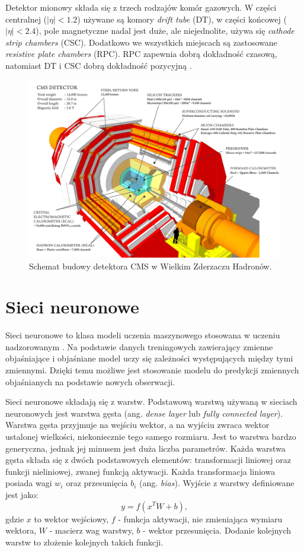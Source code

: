 \documentclass{pracalicmgr}
\begin{document}
	Detektor mionowy składa się z trzech rodzajów komór gazowych. W części centralnej ($|\eta| < 1.2$) używane są komory \textit{drift tube} (DT), w części końcowej ($|\eta| < 2.4$), pole magnetyczne nadal jest duże, ale niejednolite, używa się \textit{cathode strip chambers} (CSC). Dodatkowo we wszystkich miejscach są zastosowane \textit{resistive plate chambers} (RPC). RPC zapewnia dobrą dokładność czasową, natomiast DT i CSC dobrą dokładność pozycyjną \cite{cms_technical}.
	\newpage
	\begin{figure}[H]
	\centering
	\includegraphics[width=1\textwidth]{cms.png}
	\caption{Schemat budowy detektora CMS w Wielkim Zderzaczu Hadronów.}
	\label{fig:cms}
	\end{figure}	
	
	\section{Sieci neuronowe}
	Sieci neuronowe to klasa modeli uczenia maszynowego stosowana w uczeniu nadzorowanym \cite{dl}. Na podstawie danych treningowych zawierający zmienne objaśniające i objaśniane model uczy się zależności występujących między tymi zmiennymi. Dzięki temu możliwe jest stosowanie modelu do predykcji zmiennych objaśnianych na podstawie nowych obserwacji.
	
	Sieci neuronowe składają się z warstw. Podstawową warstwą używaną w sieciach neuronowych jest warstwa gęsta (ang. \textit{dense layer} lub \textit{fully connected layer}). Warstwa gęsta przyjmuje na wejściu wektor, a na wyjściu zwraca wektor ustalonej wielkości, niekoniecznie tego samego rozmiaru. Jest to warstwa bardzo generyczna, jednak jej minusem jest duża liczba parametrów. Każda warstwa gęsta składa się z dwóch podstawowych elementów: transformacji liniowej oraz funkcji nieliniowej, zwanej funkcją aktywacji. Każda transformacja liniowa posiada wagi $w_i$ oraz przesunięcia $b_i$ (ang. \textit{bias}). Wyjście z warstwy definiowane jest jako: $$y = f(x^TW + b),$$ gdzie $x$ to wektor wejściowy, $f$ - funkcja aktywacji, nie zmieniająca wymiaru wektora, $W$ - macierz wag warstwy, $b$ - wektor przesunięcia. Dodanie kolejnych warstw to złożenie kolejnych takich funkcji.
	
\end{document}
